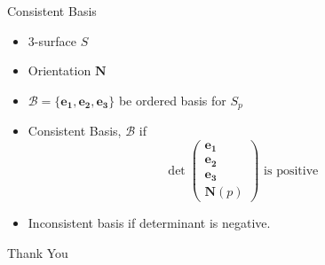 \documentclass{beamer}
\begin{document}
\begin{frame}{Consistent Basis}
\begin{definition}
\begin{itemize}
	\item $3$-surface $S$
	\item Orientation $\mathbf{N}$
	\item $\mathcal{B} = \{ \mathbf{e_1},\mathbf{e_2},\mathbf{e_3} \}$ be ordered basis for $S_p$
	\item Consistent Basis, $\mathcal{B}$ if
		$$\det \begin{pmatrix} \mathbf{e_1} \\ \mathbf{e_2} \\ \mathbf{e_3} \\ \mathbf{N}(p) \end{pmatrix} \text{ is positive} $$
		\item Inconsistent basis if determinant is negative.
\end{itemize}
\end{definition}
\end{frame}

\begin{frame}
	\vspace{0.6in}
	\hspace{3cm} {\color{blue}\Huge{Thank You}}
\end{frame}
\end{document}
